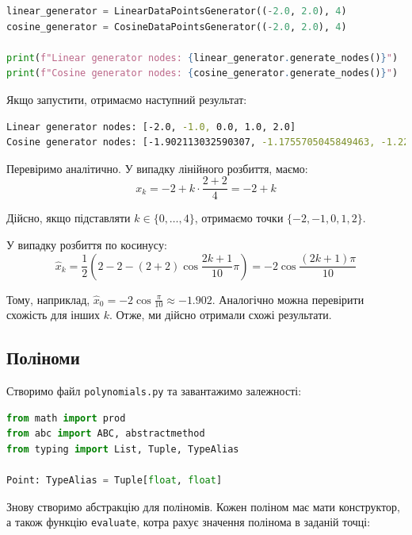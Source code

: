 \documentclass[12pt]{extarticle}
\begin{document}
\begin{lstlisting}[language=Python, caption=Використання генераторів]
linear_generator = LinearDataPointsGenerator((-2.0, 2.0), 4)
cosine_generator = CosineDataPointsGenerator((-2.0, 2.0), 4)

print(f"Linear generator nodes: {linear_generator.generate_nodes()}")
print(f"Cosine generator nodes: {cosine_generator.generate_nodes()}")
\end{lstlisting}

Якщо запустити, отримаємо наступний результат:

\begin{lstlisting}[language=bash, caption=Результат запуску генераторів]
Linear generator nodes: [-2.0, -1.0, 0.0, 1.0, 2.0]
Cosine generator nodes: [-1.902113032590307, -1.1755705045849463, -1.2246467991473532e-16, 1.175570504584946, 1.902113032590307]
\end{lstlisting}

Перевіримо аналітично. У випадку лінійного розбиття, маємо:
\[
x_k = -2 + k \cdot \frac{2+2}{4} = -2 + k
\]

Дійсно, якщо підставляти $k \in \{0,\dots,4\}$, отримаємо точки $\{-2,-1,0,1,2\}$.

У випадку розбиття по косинусу:
\[
\hat{x}_k = \frac{1}{2}\left(2-2-(2+2)\cos \frac{2k+1}{10}\pi\right) = -2 \cos \frac{(2k+1)\pi}{10}
\]

Тому, наприклад, $\hat{x}_0 = -2\cos \frac{\pi}{10} \approx -1.902$. Аналогічно можна перевірити схожість для інших $k$. Отже, ми дійсно отримали схожі результати.

\subsection{Поліноми}

Створимо файл \texttt{polynomials.py} та завантажимо залежності:

\begin{lstlisting}[language=Python, caption=Завантаження залежностей]
from math import prod
from abc import ABC, abstractmethod
from typing import List, Tuple, TypeAlias

Point: TypeAlias = Tuple[float, float]
\end{lstlisting}

Знову створимо абстракцію для поліномів. Кожен поліном має мати конструктор, а також функцію \texttt{evaluate}, котра рахує значення полінома в заданій точці:
\end{document}
